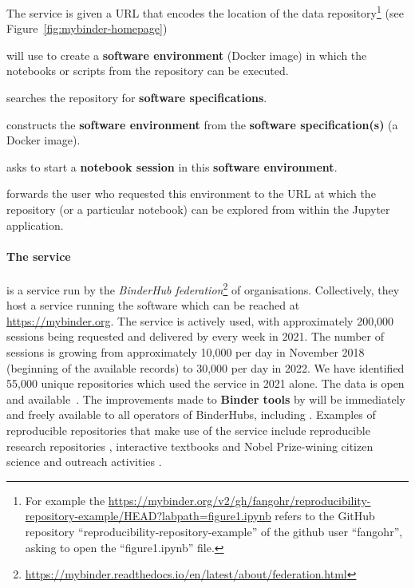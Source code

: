\begin{compactitem}
\item The \binderhub{} service is given a URL that encodes the location of the data
  repository\footnote{For example the
    {\url{https://mybinder.org/v2/gh/fangohr/reproducibility-repository-example/HEAD?labpath=figure1.ipynb}}
    refers to the GitHub repository ``reproducibility-repository-example'' of the
    github user ``fangohr'', asking to open the ``figure1.ipynb'' file.}
  (see Figure~\ref{fig:mybinder-homepage})
\item \binderhub{} will use
  \repotodocker{} to create a \textbf{software environment} (Docker image)
  in which the notebooks or scripts from the repository can be executed.
\item \repotodocker{} searches the repository for \textbf{software specifications}.
\item \repotodocker{} constructs the \textbf{software environment}
  from the \textbf{software specification(s)} (a Docker image).
\item \binderhub{} asks \JupyterHub to start
  a \textbf{notebook session} in this \textbf{software environment}.
\item \binderhub{} forwards the user who requested this environment to
  the URL at which the repository (or a particular notebook) can be explored
  from within the Jupyter application.
\end{compactitem}

\paragraph*{The \mybinder{} service}
\label{sec:mybinder}
\mybinder{} is a service run by the \emph{BinderHub
federation}\footnote{\url{https://mybinder.readthedocs.io/en/latest/about/federation.html}}
of organisations. Collectively, they host a service running the \binderhub{} software
which can be reached at \url{https://mybinder.org}.
The service is actively used, with approximately 200,000 sessions being
requested and delivered by \mybinder{} every week in 2021. The number
of sessions is growing from approximately 10,000 per day in November 2018
(beginning of the available records) to 30,000 per day in 2022. We have
identified 55,000 unique repositories which used the \mybinder{} service in 2021 alone.
The data is open and available~\cite{mybinder-archive}.
The improvements made to \textbf{Binder tools} by \TheProject will be immediately
and freely available to all operators of BinderHubs, including \mybinder{}.
Examples of reproducible repositories that make use of the \mybinder service
include reproducible research repositories
\cite{GitHubRepoExampleAlbert2016,Beg2021}, interactive textbooks
\cite{Fangohr2022,Zeller2022} and Nobel Prize-wining citizen science and outreach activities
\cite{ligo-open-science,OSCOVIDA2022}.

